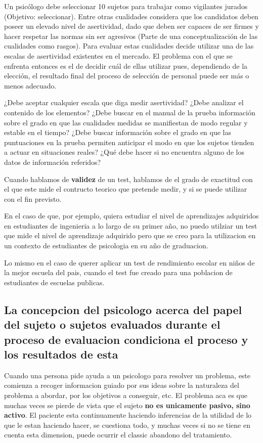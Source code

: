 \documentclass[12pt,a4paper]{article}
\begin{document}
\begin{shaded}
{Un psicólogo debe seleccionar 10 sujetos para trabajar como vigilantes
jurados (Objetivo: seleccionar). Entre otras cualidades considera que los candidatos deben poseer un elevado nivel de asertividad, dado que deben ser
capaces de ser firmes y hacer respetar las normas sin ser agresivos (Parte
de una conceptualización de las cualidades como rasgos). Para evaluar estas
cualidades decide utilizar una de las escalas de asertividad existentes en el
mercado. El problema con el que se enfrenta entonces es el de decidir cuál de
ellas utilizar pues, dependiendo de la elección, el resultado final del proceso
de selección de personal puede ser más o menos adecuado.

¿Debe aceptar cualquier escala que diga medir asertividad? ¿Debe analizar el contenido de los elementos? ¿Debe buscar en el manual de la prueba
información sobre el grado en que las cualidades medidas se manifiestan de
modo regular y estable en el tiempo? ¿Debe buscar información sobre el grado en que las puntuaciones en la prueba permiten anticipar el modo en que
los sujetos tienden a actuar en situaciones reales? ¿Qué debe hacer si no encuentra alguno de los datos de información referidos?}
\end{shaded}
 
Cuando hablamos de \textbf{validez} de un test, hablamos de el grado de exactitud con el que este mide el contructo teorico que pretende medir, y si se puede utilizar con el fin previsto. 

En el caso de que, por ejemplo, quiera estudiar el nivel de aprendizajes adquiridos en estudiantes de ingenieria a lo largo de su primer año, no puedo utilziar un test que mide el nivel de aprendizaje adquirido pero que se creo para la utilizacion en un contexto de estudiantes de psicologia en su año de graduacion. 

Lo mismo en el caso de querer aplicar un test de rendimiento escolar en niños de la mejor escuela del pais, cuando el test fue creado para una poblacion de estudiantes de escuelas publicas. 

\subsection{La concepcion del psicologo acerca del papel del sujeto o sujetos evaluados durante el proceso de evaluacion condiciona el proceso y los resultados de esta}%

Cuando una persona pide ayuda a un psicologo para resolver un problema, este comienza a recoger informacion guiado por sus ideas sobre la naturaleza del problema a abordar, por los objetivos a conseguir, etc. El problema aca es que muchas veces se pierde de vista que el sujeto \textbf{no es unicamente pasivo, sino activo}. El paciente esta continuamente haciendo inferencias de la utilidad de lo que le estan haciendo hacer, se cuestiona todo, y muchas veces si no se tiene en cuenta esta dimension, puede ocurrir el classic abandono del tratamiento. 
\end{document}
